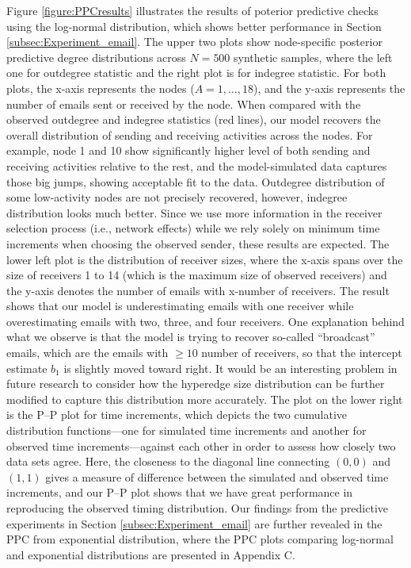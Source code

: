 \documentclass[ba]{imsart}
\numberwithin{equation}{section}
\theoremstyle{plain}
\begin{document}
	Figure \ref{figure:PPCresults} illustrates the results of poterior predictive checks using the log-normal distribution, which shows better performance in Section \ref{subsec:Experiment_email}. The upper two plots show node-specific posterior predictive degree distributions across $N=500$ synthetic samples, where the left one for outdegree statistic and the right plot is for indegree statistic. For both plots, the x-axis represents the nodes ($A=1,\ldots,18$), and the y-axis represents the number of emails sent or received by the node. When compared with the observed outdegree and indegree statistics (red lines), our model recovers the overall distribution of sending and receiving activities across the nodes. For example, node 1 and 10 show significantly higher level of both sending and receiving activities relative to the rest, and the model-simulated data captures those big jumps, showing acceptable fit to the data. Outdegree distribution of some low-activity nodes are not precisely recovered, however, indegree distribution looks much better. Since we use more information in the receiver selection process (i.e., network effects) while we rely solely on minimum time increments when choosing the observed sender, these results are expected. The lower left plot is the distribution of receiver sizes, where the x-axis spans over the size of receivers 1 to 14 (which is the maximum size of observed receivers) and the y-axis denotes the number of emails with x-number of receivers. The result shows that our model is underestimating emails with one receiver while overestimating emails with two, three, and four receivers. One explanation behind what we observe is that the model is trying to recover so-called ``broadcast'' emails, which are the emails with $\geq 10$ number of receivers, so that the intercept estimate $b_1$ is slightly moved toward right. It would be an interesting problem in future research to consider how the hyperedge size distribution can be further modified to capture this distribution more accurately. The plot on the lower right is the P--P plot for time increments, which depicts the two cumulative distribution functions---one for simulated time increments and another for observed time increments---against each other in order to assess how closely two data sets agree. Here, the closeness to the diagonal line connecting $(0, 0)$ and $(1, 1)$ gives a measure of difference between the simulated and observed time increments, and our P--P plot shows that we have great performance in reproducing the observed timing distribution. Our findings from the predictive experiments in Section \ref{subsec:Experiment_email} are further revealed in the PPC from exponential distribution, where the PPC plots comparing log-normal and exponential distributions are presented in Appendix C.
	
\end{document}
